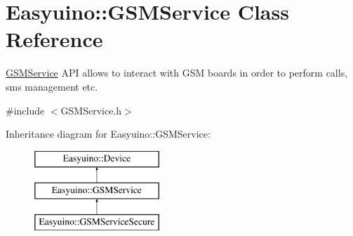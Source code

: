 \hypertarget{class_easyuino_1_1_g_s_m_service}{}\section{Easyuino\+:\+:G\+S\+M\+Service Class Reference}
\label{class_easyuino_1_1_g_s_m_service}


\hyperlink{class_easyuino_1_1_g_s_m_service}{G\+S\+M\+Service} A\+PI allows to interact with G\+SM boards in order to perform calls, sms management etc.  




{\ttfamily \#include $<$G\+S\+M\+Service.\+h$>$}

Inheritance diagram for Easyuino\+:\+:G\+S\+M\+Service\+:\begin{figure}[H]
\begin{center}
\leavevmode
\includegraphics[height=3.000000cm]{class_easyuino_1_1_g_s_m_service}
\end{center}
\end{figure}
